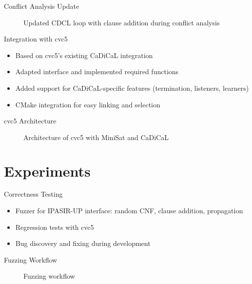 \documentclass{beamer}
\begin{document}
\begin{frame}{Conflict Analysis Update}
  \begin{figure}
    \centering
    
    \caption{Updated CDCL loop with clause addition during conflict analysis}
  \end{figure}
\end{frame}

\begin{frame}{Integration with cvc5}
  \begin{itemize}
    \item Based on cvc5's existing CaDiCaL integration
    \item Adapted interface and implemented required functions
    \item Added support for CaDiCaL-specific features (termination, listeners, learners)
    \item CMake integration for easy linking and selection
  \end{itemize}
\end{frame}

\begin{frame}{cvc5 Architecture}
  \begin{figure}
    \centering
    
    \caption{Architecture of cvc5 with MiniSat and CaDiCaL}
  \end{figure}
\end{frame}

\section{Experiments}

\begin{frame}{Correctness Testing}
  \begin{itemize}
    \item Fuzzer for IPASIR-UP interface: random CNF, clause addition, propagation
    \item Regression tests with cvc5
    \item Bug discovery and fixing during development
  \end{itemize}
\end{frame}

\begin{frame}{Fuzzing Workflow}
  \begin{figure}
    \centering
    
    \caption{Fuzzing workflow}
  \end{figure}
\end{frame}
\end{document}
